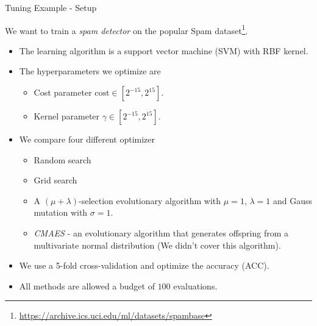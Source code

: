 \begin{frame}{Tuning Example - Setup}

    We want to train a \textit{spam detector} on the popular Spam dataset\footnote{\url{https://archive.ics.uci.edu/ml/datasets/spambase}}.

    \begin{itemize}
        \item The learning algorithm is a support vector machine (SVM) with RBF kernel.
        \item The hyperparameters we optimize are
            \begin{itemize}
                \item Cost parameter $\text{cost} \in [2^{-15}, 2^{15}]$.
                \item Kernel parameter $\gamma \in [2^{-15}, 2^{15}]$.
            \end{itemize}
        \item We compare four different optimizer
            \begin{itemize}
                \item Random search
                \item Grid search
                \item A $(\mu+\lambda)$-selection evolutionary algorithm with $\mu = 1$, $\lambda = 1$ and Gauss mutation with $\sigma = 1$.
                \item \textit{CMAES} - an evolutionary algorithm that generates offspring from a multivariate normal distribution (We didn't cover this algorithm).
            \end{itemize}
        \item We use a 5-fold cross-validation and optimize the accuracy (ACC).
        \item All methods are allowed a budget of $100$ evaluations.
    \end{itemize}

\end{frame}

